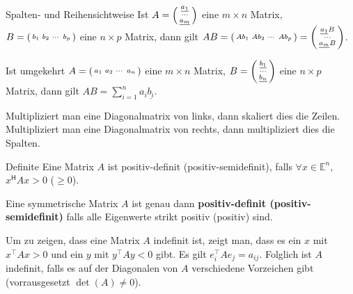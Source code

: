 \documentclass[a4paper,10pt]{article}
\newcommand*{\hermconj}{\mathsf{H}}
\def\E{\mathbb{E}}
\begin{document}
\begin{subbox}{Spalten- und Reihensichtweise}
  Ist $A = \begin{psmallmatrix}
    \underline{a_1} \\
    \cdots \\
    \underline{a_m}
  \end{psmallmatrix}$ eine $m \times n$ Matrix, $B = \begin{psmallmatrix}
    b_1 & b_2 & \cdots & b_p
  \end{psmallmatrix}$ eine $n \times p$ Matrix, dann gilt $AB = \begin{psmallmatrix}
    A b_1 & A b_2 & \cdots & A b_p
  \end{psmallmatrix} = \begin{psmallmatrix}
    \underline{a_1} B \\
    \cdots \\
    \underline{a_m} B
  \end{psmallmatrix}$.

  Ist umgekehrt $A = \begin{psmallmatrix}
    a_1 & a_2 & \cdots & a_n
  \end{psmallmatrix}$ eine $m \times n$ Matrix, $B = \begin{psmallmatrix}
    \underline{b_1} \\
    \cdots \\
    \underline{b_n}
  \end{psmallmatrix}$ eine $n \times p$ Matrix, dann gilt $AB = \sum_{i=1}^n a_i \underline{b_i}$.
\end{subbox}

Multipliziert man eine Diagonalmatrix von links, dann skaliert dies die Zeilen. Multipliziert man eine Diagonalmatrix von rechts, dann multipliziert dies die Spalten.

\begin{subbox}{Definite}
  Eine Matrix $A$ ist positiv-definit (positiv-semidefinit), falls $\forall x \in \E^n$, $x^\hermconj A x > 0$ ($\geq 0$).
\end{subbox}

Eine symmetrische Matrix $A$ ist genau dann \textbf{positiv-definit (positiv-semidefinit)} falls alle Eigenwerte strikt positiv (positiv) sind.

Um zu zeigen, dass eine Matrix $A$ indefinit ist, zeigt man, dass es ein $x$ mit $x^\top A x > 0$ und ein $y$ mit $y^\top A y < 0$ gibt. Es gilt $e_i^\top A e_j = a_{ij}$. Folglich ist $A$ indefinit, falls es auf der Diagonalen von $A$ verschiedene Vorzeichen gibt (vorrausgesetzt $\det(A) \neq 0$).
\end{document}
